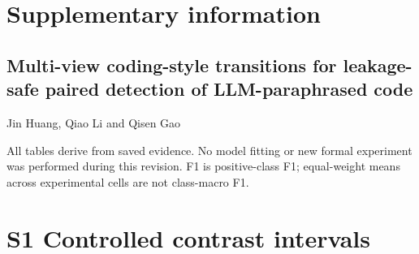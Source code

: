 \documentclass[
  10pt,
]{article}
\author{}
\date{}
\begin{document}
\section{Supplementary information}\label{supplementary-information}

\subsection{Multi-view coding-style transitions for leakage-safe paired
detection of LLM-paraphrased
code}\label{multi-view-coding-style-transitions-for-leakage-safe-paired-detection-of-llm-paraphrased-code}

Jin Huang, Qiao Li and Qisen Gao

All tables derive from saved evidence. No model fitting or new formal
experiment was performed during this revision. F1 is positive-class F1;
equal-weight means across experimental cells are not class-macro F1.

\section{S1 Controlled contrast
intervals}\label{s1-controlled-contrast-intervals}
\end{document}
